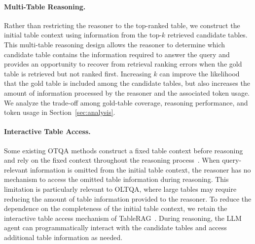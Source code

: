 \paragraph{Multi-Table Reasoning.}
Rather than restricting the reasoner to the top-ranked table, we construct the initial table context using information from the top-$k$ retrieved candidate tables.
This multi-table reasoning design allows the reasoner to determine which candidate table contains the information required to answer the query and provides an opportunity to recover from retrieval ranking errors when the gold table is retrieved but not ranked first.
Increasing $k$ can improve the likelihood that the gold table is included among the candidate tables, but also increases the amount of information processed by the reasoner and the associated token usage.
We analyze the trade-off among gold-table coverage, reasoning performance, and token usage in Section~\ref{sec:analysis}.

\paragraph{Interactive Table Access.}
Some existing OTQA methods construct a fixed table context before reasoning and rely on the fixed context throughout the reasoning process~\cite{opentab,craft}.
When query-relevant information is omitted from the initial table context, the reasoner has no mechanism to access the omitted table information during reasoning.
This limitation is particularly relevant to OLTQA, where large tables may require reducing the amount of table information provided to the reasoner.
To reduce the dependence on the completeness of the initial table context, we retain the interactive table access mechanism of TableRAG~\cite{tablerag}.
During reasoning, the LLM agent can programmatically interact with the candidate tables and access additional table information as needed.